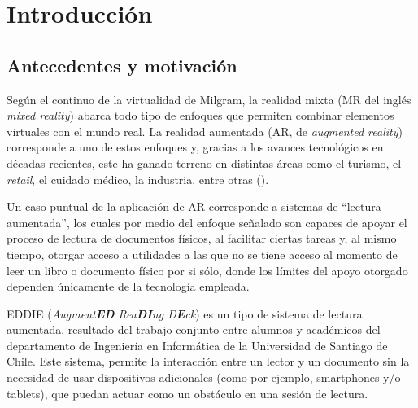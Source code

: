 \chapter{Introducci\'on}
\label{cap:introduccion}

\section{Antecedentes y motivación}
\label{intro:motivacion}
Según el continuo de la virtualidad de Milgram, la realidad mixta (MR del inglés \textit{mixed reality}) abarca todo tipo de enfoques que permiten combinar elementos virtuales con el mundo real. La realidad aumentada (AR, de \textit{augmented reality}) corresponde a uno de estos enfoques y, gracias a los avances tecnológicos en décadas recientes, este ha ganado terreno en distintas áreas como el turismo, el \textit{retail}, el cuidado médico, la industria, entre otras (\cite{jung_dieck_2018}).

Un caso puntual de la aplicación de AR corresponde a sistemas de ``lectura aumentada'', los cuales por medio del enfoque señalado son capaces de apoyar el proceso de lectura de documentos físicos, al facilitar ciertas tareas y, al mismo tiempo, otorgar acceso a utilidades a las que no se tiene acceso al momento de leer un libro o documento físico por si sólo, donde los límites del apoyo otorgado dependen únicamente de la tecnología empleada. 

EDDIE (\textit{Augment\textbf{ED} Rea\textbf{DI}ng D\textbf{E}ck}) es un tipo de sistema de lectura aumentada, resultado del trabajo conjunto entre alumnos y académicos del departamento de Ingeniería en Informática de la Universidad de Santiago de Chile. Este sistema, permite la interacción entre un lector y un documento sin la necesidad de usar dispositivos adicionales (como por ejemplo, smartphones y/o tablets), que puedan actuar como un obstáculo en una sesión de lectura.




